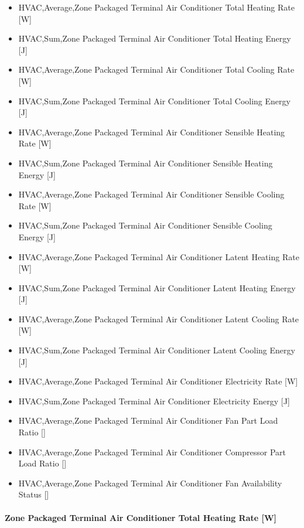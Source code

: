\begin{itemize}
\item
  HVAC,Average,Zone Packaged Terminal Air Conditioner Total Heating Rate {[}W{]}
\item
  HVAC,Sum,Zone Packaged Terminal Air Conditioner Total Heating Energy {[}J{]}
\item
  HVAC,Average,Zone Packaged Terminal Air Conditioner Total Cooling Rate {[}W{]}
\item
  HVAC,Sum,Zone Packaged Terminal Air Conditioner Total Cooling Energy {[}J{]}
\item
  HVAC,Average,Zone Packaged Terminal Air Conditioner Sensible Heating Rate {[}W{]}
\item
  HVAC,Sum,Zone Packaged Terminal Air Conditioner Sensible Heating Energy {[}J{]}
\item
  HVAC,Average,Zone Packaged Terminal Air Conditioner Sensible Cooling Rate {[}W{]}
\item
  HVAC,Sum,Zone Packaged Terminal Air Conditioner Sensible Cooling Energy {[}J{]}
\item
  HVAC,Average,Zone Packaged Terminal Air Conditioner Latent Heating Rate {[}W{]}
\item
  HVAC,Sum,Zone Packaged Terminal Air Conditioner Latent Heating Energy {[}J{]}
\item
  HVAC,Average,Zone Packaged Terminal Air Conditioner Latent Cooling Rate {[}W{]}
\item
  HVAC,Sum,Zone Packaged Terminal Air Conditioner Latent Cooling Energy {[}J{]}
\item
  HVAC,Average,Zone Packaged Terminal Air Conditioner Electricity Rate {[}W{]}
\item
  HVAC,Sum,Zone Packaged Terminal Air Conditioner Electricity Energy {[}J{]}
\item
  HVAC,Average,Zone Packaged Terminal Air Conditioner Fan Part Load Ratio {[]}
\item
  HVAC,Average,Zone Packaged Terminal Air Conditioner Compressor Part Load Ratio {[]}
\item
  HVAC,Average,Zone Packaged Terminal Air Conditioner Fan Availability Status {[]}
\end{itemize}

\paragraph{Zone Packaged Terminal Air Conditioner Total Heating Rate {[}W{]}}\label{zone-packaged-terminal-air-conditioner-total-heating-rate-w}

